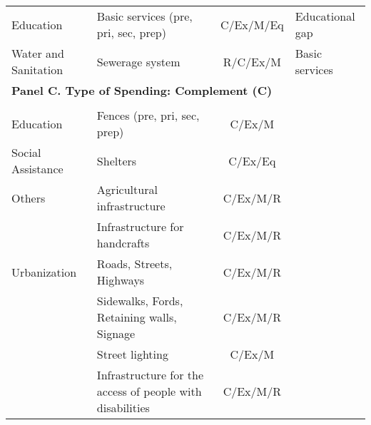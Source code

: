 \begin{tabular}{llcl}
		Education & Basic services (pre, pri, sec, prep) & C/Ex/M/Eq & Educational gap
		\\ 
		Water and Sanitation & Sewerage system & R/C/Ex/M & Basic services
		 \\
		 
		\midrule
		\multicolumn{4}{l}{\textbf{Panel C. Type of Spending: Complement (C)}}
		 \\
		\vspace{0.2 cm} \\
		Education & Fences (pre, pri, sec, prep) & C/Ex/M &
		\\ 
		Social Assistance & Shelters & C/Ex/Eq & 
		\\
		\midrule
		Others & Agricultural infrastructure & C/Ex/M/R & 
		\\ 
		 & Infrastructure for handcrafts & C/Ex/M/R &
		\\ 
		\midrule
		Urbanization& Roads, Streets, Highways & C/Ex/M/R &
		\\ 
		 & Sidewalks, Fords, Retaining walls, Signage & C/Ex/M/R & 
		\\ 
		 & Street lighting & C/Ex/M & 
		\\ 
		 & Infrastructure for the access of people with disabilities & C/Ex/M/R &
		\\ 
		\hline
		
		\bottomrule
	\end{tabular}
	